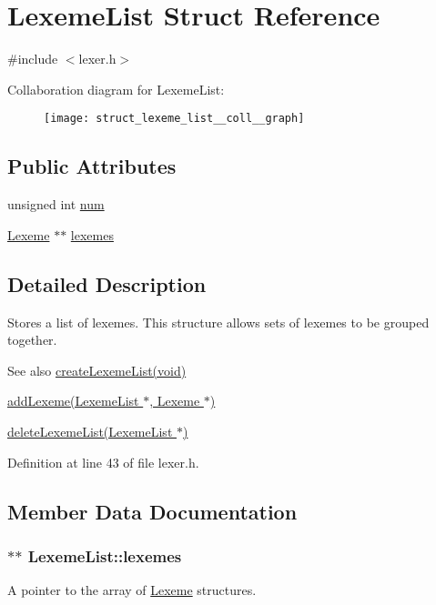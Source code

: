 \hypertarget{struct_lexeme_list}{\section{Lexeme\-List Struct Reference}
\label{struct_lexeme_list}
}


{\ttfamily \#include $<$lexer.\-h$>$}



Collaboration diagram for Lexeme\-List\-:
\nopagebreak
\begin{figure}[H]
\begin{center}
\leavevmode
\texttt{[image: struct\_lexeme\_list\_\_coll\_\_graph]}
\end{center}
\end{figure}
\subsection*{Public Attributes}
\begin{DoxyCompactItemize}
\item 
unsigned int \hyperlink{struct_lexeme_list_ab9e4971353dc5b435d604d3dbaef1857}{num}
\item 
\hyperlink{struct_lexeme}{Lexeme} $\ast$$\ast$ \hyperlink{struct_lexeme_list_a26e2c4bffe56f01e4d9b7c14ced653fd}{lexemes}
\end{DoxyCompactItemize}


\subsection{Detailed Description}
Stores a list of lexemes. This structure allows sets of lexemes to be grouped together.

\begin{DoxySeeAlso}{See also}
\hyperlink{lexer_8h_a03a7275accd6e39d369c689760bd15df}{create\-Lexeme\-List(void)} 

\hyperlink{lexer_8h_af9ec30b004772b01fb38f6dc4f54d102}{add\-Lexeme(\-Lexeme\-List $\ast$, Lexeme $\ast$)} 

\hyperlink{lexer_8h_a3a834cd76633550e9b8be7368cdeae3d}{delete\-Lexeme\-List(\-Lexeme\-List $\ast$)} 
\end{DoxySeeAlso}


Definition at line 43 of file lexer.\-h.



\subsection{Member Data Documentation}
\hypertarget{struct_lexeme_list_a26e2c4bffe56f01e4d9b7c14ced653fd}{
\subsubsection[{lexemes}]{$\ast$$\ast$ {\bf Lexeme\-List\-::lexemes}}}\label{struct_lexeme_list_a26e2c4bffe56f01e4d9b7c14ced653fd}
A pointer to the array of \hyperlink{struct_lexeme}{Lexeme} structures. 

